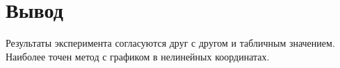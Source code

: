 \section{Вывод}
Результаты эксперимента согласуются друг с другом и табличным значением. Наиболее точен метод
с графиком в нелинейных координатах.
